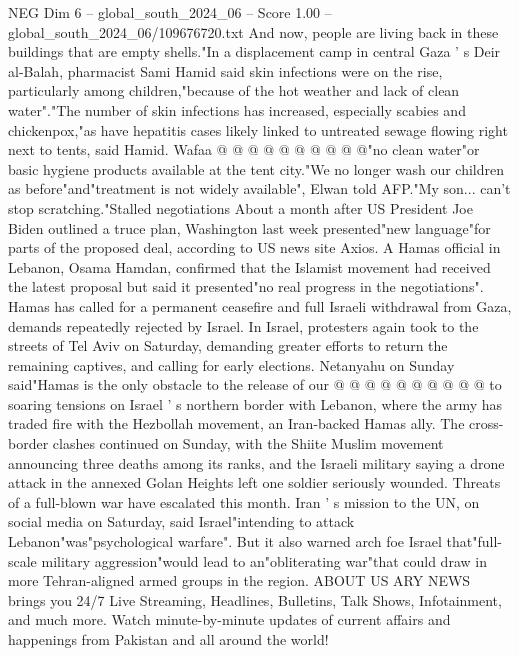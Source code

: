 \begin{textsample}{NEG Dim 6 – global\_south\_2024\_06 – Score 1.00 – global\_south\_2024\_06/109676720.txt}
And now, people are living back in these buildings that are empty shells."In a displacement camp in central Gaza ' s Deir al-Balah, pharmacist Sami Hamid said skin infections were on the rise, particularly among children,"because of the hot weather and lack of clean water"."The number of skin infections has increased, especially scabies and chickenpox,"as have hepatitis cases likely linked to untreated sewage flowing right next to tents, said Hamid.
Wafaa @ @ @ @ @ @ @ @ @ @"no clean water"or basic hygiene products available at the tent city."We no longer wash our children as before"and"treatment is not widely available", Elwan told AFP."My son... can't stop scratching."Stalled negotiations About a month after US President Joe Biden outlined a truce plan, Washington last week presented"new language"for parts of the proposed deal, according to US news site Axios.
A Hamas official in Lebanon, Osama Hamdan, confirmed that the Islamist movement had received the latest proposal but said it presented"no real progress in the negotiations".
Hamas has called for a permanent ceasefire and full Israeli withdrawal from Gaza, demands repeatedly rejected by Israel.
In Israel, protesters again took to the streets of Tel Aviv on Saturday, demanding greater efforts to return the remaining captives, and calling for early elections.
Netanyahu on Sunday said"Hamas is the only obstacle to the release of our @ @ @ @ @ @ @ @ @ @ to soaring tensions on Israel ' s northern border with Lebanon, where the army has traded fire with the Hezbollah movement, an Iran-backed Hamas ally.
The cross-border clashes continued on Sunday, with the Shiite Muslim movement announcing three deaths among its ranks, and the Israeli military saying a drone attack in the annexed Golan Heights left one soldier seriously wounded.
Threats of a full-blown war have escalated this month.
Iran ' s mission to the UN, on social media on Saturday, said Israel"intending to attack Lebanon"was"psychological warfare".
But it also warned arch foe Israel that"full-scale military aggression"would lead to an"obliterating war"that could draw in more Tehran-aligned armed groups in the region.
ABOUT US ARY NEWS brings you 24/7 Live Streaming, Headlines, Bulletins, Talk Shows, Infotainment, and much more.
Watch minute-by-minute updates of current affairs and happenings from Pakistan and all around the world!

\end{textsample}
